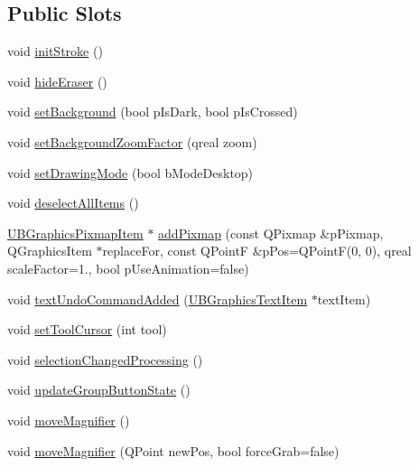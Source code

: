 \subsection*{Public Slots}
\begin{DoxyCompactItemize}
\item 
void \hyperlink{class_u_b_graphics_scene_a883f9c98b65f6fb3fd559abd3969fd42}{init\-Stroke} ()
\item 
void \hyperlink{class_u_b_graphics_scene_abb129e3c7327ec690d7c4f5f5dee3836}{hide\-Eraser} ()
\item 
void \hyperlink{class_u_b_graphics_scene_ad34fd16dd510a1a28cf2df3227a57a14}{set\-Background} (bool p\-Is\-Dark, bool p\-Is\-Crossed)
\item 
void \hyperlink{class_u_b_graphics_scene_af42d001c250f1368e664c3243500373f}{set\-Background\-Zoom\-Factor} (qreal zoom)
\item 
void \hyperlink{class_u_b_graphics_scene_a9c819f5d1dd2c630c8bb62c11d17fa5f}{set\-Drawing\-Mode} (bool b\-Mode\-Desktop)
\item 
void \hyperlink{class_u_b_graphics_scene_a6cfc68b3907297af710a1d8d1492d4ea}{deselect\-All\-Items} ()
\item 
\hyperlink{class_u_b_graphics_pixmap_item}{U\-B\-Graphics\-Pixmap\-Item} $\ast$ \hyperlink{class_u_b_graphics_scene_ab76488f73cd11e58ce91a3b7e2467bf6}{add\-Pixmap} (const Q\-Pixmap \&p\-Pixmap, Q\-Graphics\-Item $\ast$replace\-For, const Q\-Point\-F \&p\-Pos=Q\-Point\-F(0, 0), qreal scale\-Factor=1., bool p\-Use\-Animation=false)
\item 
void \hyperlink{class_u_b_graphics_scene_a72110f0d1fe8495355f25975ed7a1ed3}{text\-Undo\-Command\-Added} (\hyperlink{class_u_b_graphics_text_item}{U\-B\-Graphics\-Text\-Item} $\ast$text\-Item)
\item 
void \hyperlink{class_u_b_graphics_scene_a05efdd2cb21422270b1735c38faf0839}{set\-Tool\-Cursor} (int tool)
\item 
void \hyperlink{class_u_b_graphics_scene_a23ff2728419619904a2d7680c63cb0eb}{selection\-Changed\-Processing} ()
\item 
void \hyperlink{class_u_b_graphics_scene_a94a8bb0eb91d5db7904d7bc2932cdc0e}{update\-Group\-Button\-State} ()
\item 
void \hyperlink{class_u_b_graphics_scene_ae1ba0d5c8d2980ebe07e7207d868b4db}{move\-Magnifier} ()
\item 
void \hyperlink{class_u_b_graphics_scene_a2a4e3d9011f5636f040fb6582a559d84}{move\-Magnifier} (Q\-Point new\-Pos, bool force\-Grab=false)

\end{DoxyCompactItemize}
